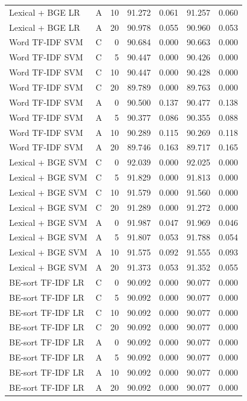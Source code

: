 \begin{longtable}{llrrrrr}
Lexical + BGE LR & A & 10 & 91.272 & 0.061 & 91.257 & 0.060 \\
Lexical + BGE LR & A & 20 & 90.978 & 0.055 & 90.960 & 0.053 \\
Word TF-IDF SVM & C & 0 & 90.684 & 0.000 & 90.663 & 0.000 \\
Word TF-IDF SVM & C & 5 & 90.447 & 0.000 & 90.426 & 0.000 \\
Word TF-IDF SVM & C & 10 & 90.447 & 0.000 & 90.428 & 0.000 \\
Word TF-IDF SVM & C & 20 & 89.789 & 0.000 & 89.763 & 0.000 \\
Word TF-IDF SVM & A & 0 & 90.500 & 0.137 & 90.477 & 0.138 \\
Word TF-IDF SVM & A & 5 & 90.377 & 0.086 & 90.355 & 0.088 \\
Word TF-IDF SVM & A & 10 & 90.289 & 0.115 & 90.269 & 0.118 \\
Word TF-IDF SVM & A & 20 & 89.746 & 0.163 & 89.717 & 0.165 \\
Lexical + BGE SVM & C & 0 & 92.039 & 0.000 & 92.025 & 0.000 \\
Lexical + BGE SVM & C & 5 & 91.829 & 0.000 & 91.813 & 0.000 \\
Lexical + BGE SVM & C & 10 & 91.579 & 0.000 & 91.560 & 0.000 \\
Lexical + BGE SVM & C & 20 & 91.289 & 0.000 & 91.272 & 0.000 \\
Lexical + BGE SVM & A & 0 & 91.987 & 0.047 & 91.969 & 0.046 \\
Lexical + BGE SVM & A & 5 & 91.807 & 0.053 & 91.788 & 0.054 \\
Lexical + BGE SVM & A & 10 & 91.575 & 0.092 & 91.555 & 0.093 \\
Lexical + BGE SVM & A & 20 & 91.373 & 0.053 & 91.352 & 0.055 \\
BE-sort TF-IDF LR & C & 0 & 90.092 & 0.000 & 90.077 & 0.000 \\
BE-sort TF-IDF LR & C & 5 & 90.092 & 0.000 & 90.077 & 0.000 \\
BE-sort TF-IDF LR & C & 10 & 90.092 & 0.000 & 90.077 & 0.000 \\
BE-sort TF-IDF LR & C & 20 & 90.092 & 0.000 & 90.077 & 0.000 \\
BE-sort TF-IDF LR & A & 0 & 90.092 & 0.000 & 90.077 & 0.000 \\
BE-sort TF-IDF LR & A & 5 & 90.092 & 0.000 & 90.077 & 0.000 \\
BE-sort TF-IDF LR & A & 10 & 90.092 & 0.000 & 90.077 & 0.000 \\
BE-sort TF-IDF LR & A & 20 & 90.092 & 0.000 & 90.077 & 0.000 \\

\end{longtable}
